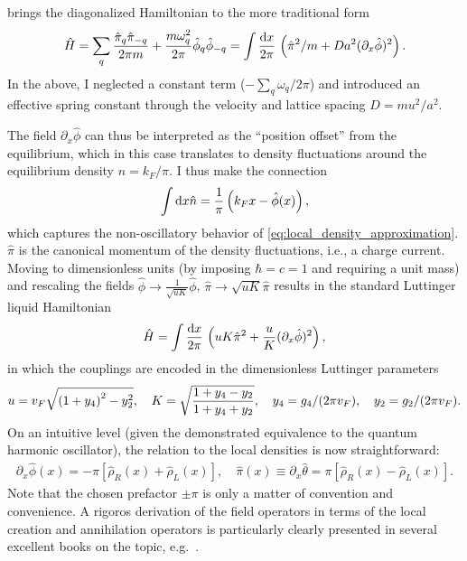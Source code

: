 brings the diagonalized Hamiltonian to the more traditional form
\begin{align}
    \hat H = \sum_q \frac{\hat\pi_q\hat\pi_{-q}}{2\pi m} + \frac{m\omega_q^2}{2\pi}\hat\phi_q\hat\phi_{-q}
    =
    \int\frac{\mathrm d x}{2\pi}\, \left( \hat\pi^2/m + {Da^2}(\partial_x\hat\phi)^2 \right).
\end{align}
In the above, I neglected a constant term ($-\sum_q\omega_q/2\pi$) and introduced an effective spring constant through the velocity and lattice spacing $D=mu^2/a^2$.

The field $\partial_x\hat\phi$ can thus be interpreted as the ``position offset'' from the equilibrium, which in this case translates to density fluctuations around the equilibrium density $n=k_F/\pi$.
I thus make the connection
\begin{align}
    \int\mathrm d x\hat n = \frac1\pi\left( k_Fx - \hat\phi(x) \right),
\end{align}
which captures the non-oscillatory behavior of \cref{eq:local_density_approximation}.
$\hat\pi$ is the canonical momentum of the density fluctuations, i.e., a charge current.
Moving to dimensionless units (by imposing $\hbar=c=1$ and requiring a unit mass) and rescaling the fields $\hat\phi\rightarrow \frac1{\sqrt{uK}}\hat\phi$, $\hat\pi\rightarrow \sqrt{uK}\hat\pi$ results in the standard Luttinger liquid Hamiltonian
\begin{align}
    \hat H = \int\frac{\mathrm d x}{2\pi}\, \left( uK\hat\pi^2 + \frac uK(\partial_x\hat\phi)^2 \right),
    \label{eq:ll_hamiltonian}
\end{align}
in which the couplings are encoded in the dimensionless Luttinger parameters
\begin{align}
    u = v_F\sqrt{\left( 1 + y_4 \right)^2 - y_2^2},
    \quad
    K = \sqrt{\frac{1+y_4-y_2}{1+y_4+y_2}},
    \quad
    y_4=g_4/(2\pi v_F),
    \quad
    y_2=g_2/(2\pi v_F).
\end{align}
On an intuitive level (given the demonstrated equivalence to the quantum harmonic oscillator), the relation to the local densities is now straightforward:
\begin{align}
    \partial_x\hat\phi(x)=-\pi[\hat\rho_R(x)+\hat\rho_L(x)],
    \quad
    \hat\pi(x)\equiv\partial_x\hat\theta=\pi[\hat\rho_R(x)-\hat\rho_L(x)].
\end{align}
Note that the chosen prefactor $\pm\pi$ is only a matter of convention and convenience.
A rigoros derivation of the field operators in terms of the local creation and annihilation operators is particularly clearly presented in several excellent books on the topic, e.g.~\cite{Bruus2004,Giamarchi2003,Gogolin2004}.


